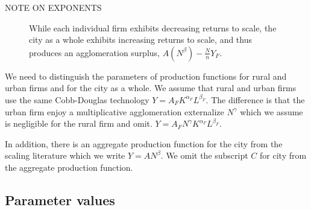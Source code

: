 NOTE ON EXPONENTS

\begin{figure}[htb]
    \centering

    \caption{While each individual firm exhibits decreasing returns to scale, the city as a whole exhibits increasing returns to scale, and thus produces an agglomeration surplus, $A(N^\beta)-\frac{N}{n}Y_F$.}
    \label{fig:Agglomeration-surplus}
\end{figure}

We need to distinguish the parameters of production functions for rural and urban firms and for the city as a whole. We assume that  rural and  urban firms use the same Cobb-Douglas technology $Y=A_FK^{\alpha_F}L^{\beta_F}$. The difference is that the urban firm enjoy a  multiplicative agglomeration externalize $N^\gamma$ which we assume is negligible for the rural firm and omit. $Y=A_FN^\gamma  K^{\alpha_F}L^{\beta_F}$.

In addition, there is an aggregate production function for the city from the scaling literature which we write $Y=AN^\beta$. We omit the subscript $C$ for city from   the aggregate production function.

\subsection{Parameter values}\label{sec-param-values}

